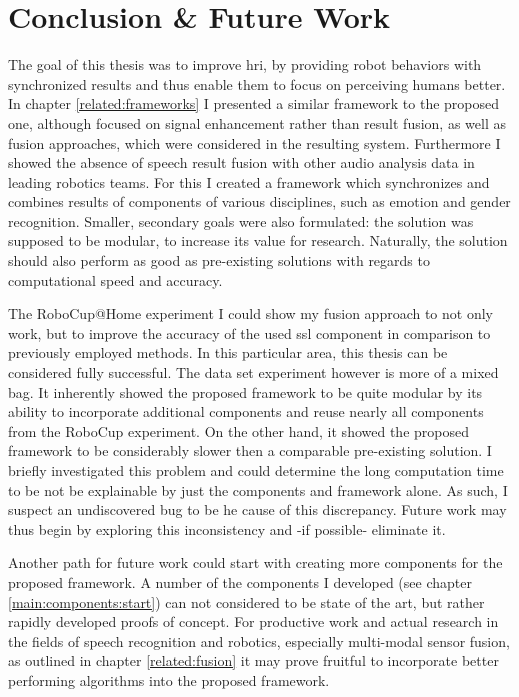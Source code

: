 

\chapter{Conclusion \& Future Work}
\label{conclusion}

The goal of this thesis was to improve \gls{hri}, by providing robot behaviors with synchronized results and thus enable them to focus on perceiving humans better.
In chapter \ref{related:frameworks} I presented a similar framework to the proposed one, although focused on signal enhancement rather than result fusion, as well as fusion approaches, which were considered in the resulting system.
Furthermore I showed the absence of speech result fusion with other audio analysis data in leading robotics teams.
For this I created a framework which synchronizes and combines results of components of various disciplines, such as emotion and gender recognition.
Smaller, secondary goals were also formulated:
the solution was supposed to be modular, to increase its value for research.
Naturally, the solution should also perform as good as pre-existing solutions with regards to computational speed and accuracy.

The RoboCup@Home experiment I could show my fusion approach to not only work, but to improve the accuracy of the used \gls{ssl} component in comparison to previously employed methods.
In this particular area, this thesis can be considered fully successful.
The data set experiment however is more of a mixed bag.
It inherently showed the proposed framework to be quite modular by its ability to incorporate additional components and reuse nearly all components from the RoboCup experiment.
On the other hand, it showed the proposed framework to be considerably slower then a comparable pre-existing solution.
I briefly investigated this problem and could determine the long computation time to be not be explainable by just the components and framework alone.
As such, I suspect an undiscovered bug to be he cause of this discrepancy.
Future work may thus begin by exploring this inconsistency and -if possible- eliminate it.

Another path for future work could start with creating more components for the proposed framework.
A number of the components I developed (see chapter \ref{main:components:start}) can not considered to be state of the art, but rather rapidly developed proofs of concept.
For productive work and actual research in the fields of speech recognition and robotics, especially multi-modal sensor fusion, as outlined in chapter \ref{related:fusion} it may prove fruitful to incorporate better performing algorithms into the proposed framework.


